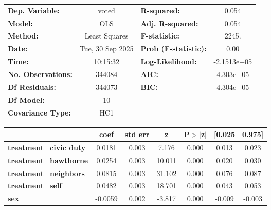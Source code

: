 \begin{center}
\begin{tabular}{lclc}
\toprule
\textbf{Dep. Variable:}        &      voted       & \textbf{  R-squared:         } &      0.054   \\
\textbf{Model:}                &       OLS        & \textbf{  Adj. R-squared:    } &      0.054   \\
\textbf{Method:}               &  Least Squares   & \textbf{  F-statistic:       } &      2245.   \\
\textbf{Date:}                 & Tue, 30 Sep 2025 & \textbf{  Prob (F-statistic):} &      0.00    \\
\textbf{Time:}                 &     10:15:32     & \textbf{  Log-Likelihood:    } & -2.1513e+05  \\
\textbf{No. Observations:}     &      344084      & \textbf{  AIC:               } &  4.303e+05   \\
\textbf{Df Residuals:}         &      344073      & \textbf{  BIC:               } &  4.304e+05   \\
\textbf{Df Model:}             &          10      & \textbf{                     } &              \\
\textbf{Covariance Type:}      &       HC1        & \textbf{                     } &              \\
\bottomrule
\end{tabular}
\begin{tabular}{lcccccc}
                               & \textbf{coef} & \textbf{std err} & \textbf{z} & \textbf{P$> |$z$|$} & \textbf{[0.025} & \textbf{0.975]}  \\
\midrule
\textbf{treatment\_civic duty} &       0.0181  &        0.003     &     7.176  &         0.000        &        0.013    &        0.023     \\
\textbf{treatment\_hawthorne}  &       0.0254  &        0.003     &    10.011  &         0.000        &        0.020    &        0.030     \\
\textbf{treatment\_neighbors}  &       0.0815  &        0.003     &    31.102  &         0.000        &        0.076    &        0.087     \\
\textbf{treatment\_self}       &       0.0482  &        0.003     &    18.701  &         0.000        &        0.043    &        0.053     \\
\textbf{sex}                   &      -0.0059  &        0.002     &    -3.817  &         0.000        &       -0.009    &       -0.003     \\

\end{tabular}
\end{center}

